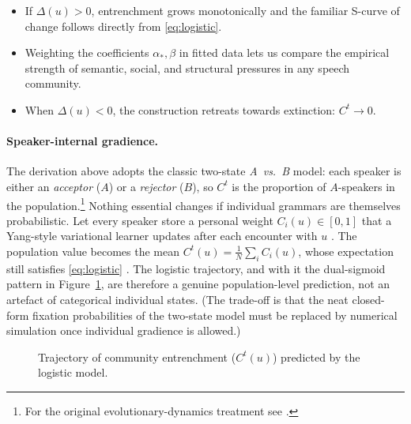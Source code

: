 \documentclass[12pt,letterpaper]{article}
\begin{document}
\begin{itemize}
\item If $\Delta(u)\!>\!0$, entrenchment grows monotonically and the familiar
  S-curve of change follows directly from \eqref{eq:logistic}.
\item Weighting the coefficients $\alpha_{\ast},\beta$ in fitted
  data lets us compare the empirical strength of semantic,
  social, and structural pressures in any speech community.
\item When $\Delta(u)\!<\!0$, the construction retreats towards extinction:
  $C^{t}\!\to\!0$.
\end{itemize}

\paragraph{Speaker-internal gradience.}
The derivation above adopts the classic two-state
\emph{A~vs.~B} model: each speaker is either an \emph{acceptor}
($A$) or a \emph{rejector} ($B$), so $C^{t}$ is the proportion of
$A$-speakers in the population.\footnote{For the original
evolutionary-dynamics treatment see \textcite{Nowak2001}.}
Nothing essential changes if individual grammars are themselves
probabilistic.  Let every speaker store a personal weight
$C_{i}(u)\in[0,1]$ that a Yang-style variational learner updates
after each encounter with $u$ \autocite{Yang2000}.  The
population value becomes the mean
$C^{t}(u)=\tfrac{1}{N}\sum_{i}C_{i}(u)$, whose expectation still
satisfies \eqref{eq:logistic}
\autocite{BlytheCroft2012}.  The logistic trajectory,
and with it the dual-sigmoid pattern in
Figure~\ref{fig:trajectory}, are therefore a genuine population-level
prediction, not an artefact of categorical individual states.
(The trade-off is that the neat closed-form fixation
probabilities of the two-state model must be replaced by numerical
simulation once individual gradience is allowed.)

\begin{figure}[t]
  \centering
  \caption{Trajectory of community entrenchment
           ($C^{t}(u)$) predicted by the logistic model.}
  \label{fig:trajectory}
\end{figure}
\end{document}
